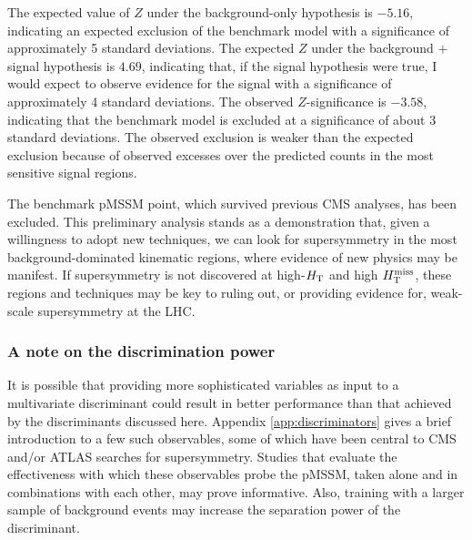 The expected value of $Z$ under the background-only hypothesis is $-5.16$, indicating an expected exclusion of the benchmark model with a significance of approximately 5 standard deviations. The expected $Z$ under the background $+$ signal hypothesis is $4.69$, indicating that, if the signal hypothesis were true, I would expect to observe evidence for the signal with a significance of approximately 4 standard deviations. The observed $Z$-significance is $-3.58$, indicating that the benchmark model is excluded at a significance of about 3 standard deviations. The observed exclusion is weaker than the expected exclusion because of observed excesses over the predicted counts in the most sensitive signal regions.

The benchmark pMSSM point, which survived previous CMS analyses, has been excluded. This preliminary analysis stands as a demonstration that, given a willingness to adopt new techniques, we can look for supersymmetry in the most background-dominated kinematic regions, where evidence of new physics may be manifest. If supersymmetry is not discovered at high-$H_{\rm T}$ and high $H_{\text{T}}^{\rm miss}$, these regions and techniques may be key to ruling out, or providing evidence for, weak-scale supersymmetry at the LHC.


\subsubsection{A note on the discrimination power}
It is possible that providing more sophisticated variables as input to a multivariate discriminant could result in better performance than that achieved by the discriminants discussed here. Appendix \ref{app:discriminators} gives a brief introduction to a few such observables, some of which have been central to CMS and/or ATLAS searches for supersymmetry. Studies that evaluate the effectiveness with which these observables probe the pMSSM, taken alone and in combinations with each other, may prove informative. Also, training with a larger sample of background events may increase the separation power of the discriminant. 




